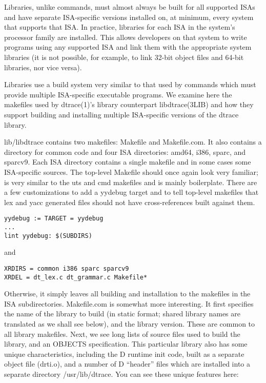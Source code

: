 \documentclass{article}
\begin{document}
Libraries, unlike commands, must almost always be built for all supported ISAs
and have separate ISA-specific versions installed on, at minimum, every system
that supports that ISA. In practice, libraries for each ISA in the system's
processor family are installed. This allows developers on that system to write
programs using any supported ISA and link them with the appropriate system
libraries (it is not possible, for example, to link 32-bit object files and
64-bit libraries, nor vice versa).

Libraries use a build system very similar to that used by commands which must
provide multiple ISA-specific executable programs. We examine here the
makefiles used by dtrace(1)'s library counterpart libdtrace(3LIB) and how they
support building and installing multiple ISA-specific versions of the dtrace
library.

lib/libdtrace contains two makefiles: Makefile and Makefile.com. It also
contains a directory for common code and four ISA directories: amd64, i386,
sparc, and sparcv9. Each ISA directory contains a single makefile and in some
cases some ISA-specific sources. The top-level Makefile should once again look
very familiar; is very similar to the uts and cmd makefiles and is mainly
boilerplate. There are a few customizations to add a yydebug target and to tell
top-level makefiles that lex and yacc generated files should not have
cross-references built against them.

\begin{verbatim}
yydebug := TARGET = yydebug
...
lint yydebug: $(SUBDIRS)
\end{verbatim}

and

\begin{verbatim}
XRDIRS = common i386 sparc sparcv9
XRDEL = dt_lex.c dt_grammar.c Makefile*
\end{verbatim}

Otherwise, it simply leaves all building and installation to the makefiles in
the ISA subdirectories. Makefile.com is somewhat more interesting. It first
specifies the name of the library to build (in static format; shared library
names are translated as we shall see below), and the library version. These are
common to all library makefiles. Next, we see long lists of source files used to
build the library, and an OBJECTS specification. This particular library also
has some unique characteristics, including the D runtime init code, built as a
separate object file (drti.o), and a number of D ``header'' files which are
installed into a separate directory /usr/lib/dtrace. You can see these unique
features here:
\end{document}
